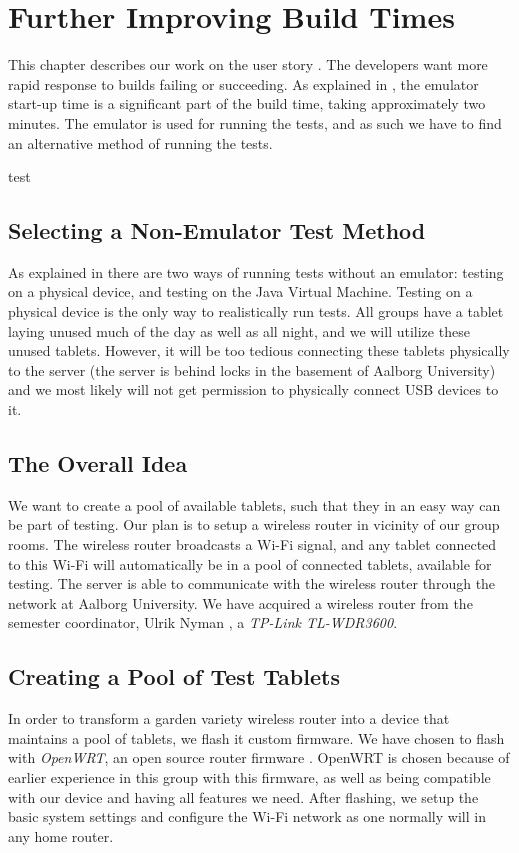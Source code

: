 \chapter{Further Improving Build Times}
This chapter describes our work on the user story . The developers want more rapid response to builds failing or succeeding. As explained in , the emulator start-up time is a significant part of the build time, taking approximately two minutes. The emulator is used for running the tests, and as such we have to find an alternative method of running the tests.

\begin{chapterorganization}
  \item test
\end{chapterorganization}

\section{Selecting a Non-Emulator Test Method}
As explained in  there are two ways of running tests without an emulator: testing on a physical device, and testing on the Java Virtual Machine. Testing on a physical device is the only way to realistically run tests. All groups have a tablet laying unused much of the day as well as all night, and we will utilize these unused tablets. However, it will be too tedious connecting these tablets physically to the server (the server is behind locks in the basement of Aalborg University) and we most likely will not get permission to physically connect USB devices to it.

\section{The Overall Idea}
We want to create a pool of available tablets, such that they in an easy way can be part of testing. Our plan is to setup a wireless router in vicinity of our group rooms. The wireless router broadcasts a Wi-Fi signal, and any tablet connected to this Wi-Fi will automatically be in a pool of connected tablets, available for testing. The server is able to communicate with the wireless router through the network at Aalborg University. We have acquired a wireless router from the semester coordinator, Ulrik Nyman , a \emph{TP-Link TL-WDR3600}.

\section{Creating a Pool of Test Tablets}
In order to transform a garden variety wireless router into a device that maintains a pool of tablets, we flash it custom firmware. We have chosen to flash with \emph{OpenWRT}, an open source router firmware . OpenWRT is chosen because of earlier experience in this group with this firmware, as well as being compatible with our device and having all features we need. After flashing, we setup the basic system settings and configure the Wi-Fi network as one normally will in any home router.

